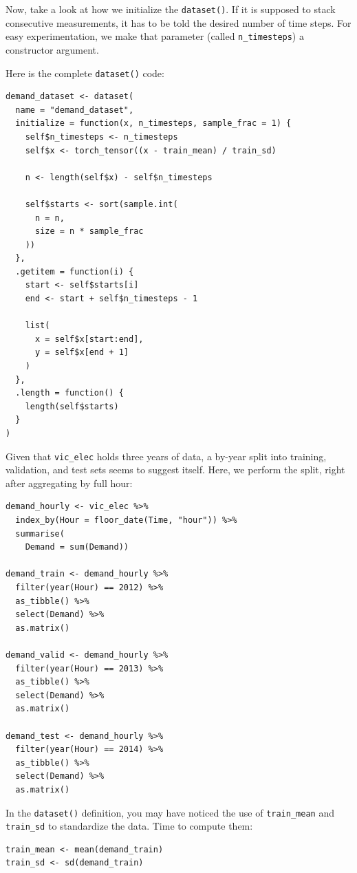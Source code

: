 \documentclass[
  letterpaper,
]{krantz}
\begin{document}
Now, take a look at how we initialize the \texttt{dataset()}. If it is
supposed to stack consecutive measurements, it has to be told the
desired number of time steps. For easy experimentation, we make that
parameter (called \texttt{n\_timesteps}) a constructor argument.

Here is the complete \texttt{dataset()} code:

\begin{verbatim}
demand_dataset <- dataset(
  name = "demand_dataset",
  initialize = function(x, n_timesteps, sample_frac = 1) {
    self$n_timesteps <- n_timesteps
    self$x <- torch_tensor((x - train_mean) / train_sd)

    n <- length(self$x) - self$n_timesteps

    self$starts <- sort(sample.int(
      n = n,
      size = n * sample_frac
    ))
  },
  .getitem = function(i) {
    start <- self$starts[i]
    end <- start + self$n_timesteps - 1

    list(
      x = self$x[start:end],
      y = self$x[end + 1]
    )
  },
  .length = function() {
    length(self$starts)
  }
)
\end{verbatim}

Given that \texttt{vic\_elec} holds three years of data, a by-year split
into training, validation, and test sets seems to suggest itself. Here,
we perform the split, right after aggregating by full hour:

\begin{verbatim}
demand_hourly <- vic_elec %>%
  index_by(Hour = floor_date(Time, "hour")) %>%
  summarise(
    Demand = sum(Demand))

demand_train <- demand_hourly %>% 
  filter(year(Hour) == 2012) %>%
  as_tibble() %>%
  select(Demand) %>%
  as.matrix()

demand_valid <- demand_hourly %>% 
  filter(year(Hour) == 2013) %>%
  as_tibble() %>%
  select(Demand) %>%
  as.matrix()

demand_test <- demand_hourly %>% 
  filter(year(Hour) == 2014) %>%
  as_tibble() %>%
  select(Demand) %>%
  as.matrix()
\end{verbatim}

In the \texttt{dataset()} definition, you may have noticed the use of
\texttt{train\_mean} and \texttt{train\_sd} to standardize the data.
Time to compute them:

\begin{verbatim}
train_mean <- mean(demand_train)
train_sd <- sd(demand_train)
\end{verbatim}
\end{document}

